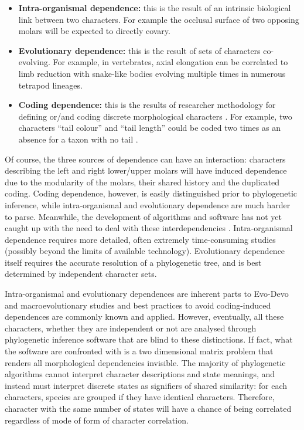 \documentclass[12pt,letterpaper]{article}
\begin{document}
\begin{itemize}
    \item \textbf{Intra-organismal dependence:} this is the result of an intrinsic biological link between two characters.
    For example the occlusal surface of two opposing molars will be expected to directly covary.
 
    \item \textbf{Evolutionary dependence:} this is the result of sets of characters co-evolving. 
    For example, in vertebrates, axial elongation can be correlated to limb reduction with snake-like bodies evolving multiple times in numerous tetrapod lineages.

    \item \textbf{Coding dependence:} this is the results of researcher methodology for defining or/and coding discrete morphological characters \citep{Brazeau2011,simoes2017giant}.
    For example, two characters ``tail colour'' and ``tail length'' could be coded two times as an absence for a taxon with no tail \citep{wilkinson1995coping,BrazeauNA}.
\end{itemize}

\noindent Of course, the three sources of dependence can have an interaction: characters describing the left and right lower/upper molars will have induced dependence due to the modularity of the molars, their shared history and the duplicated coding.
Coding dependence, however, is easily distinguished prior to phylogenetic inference, while intra-organismal and evolutionary dependence are much harder to parse.
Meanwhile, the development of algorithms and software has not yet caught up with the need to deal with these interdependencies \citep{de2015parsimony,BrazeauNA}.
Intra-organismal dependence requires more detailed, often extremely time-consuming studies (possibly beyond the limits of available technology).
Evolutionary dependence itself requires the accurate resolution of a phylogenetic tree, and is best determined by independent character sets. 

Intra-organismal and evolutionary dependences are inherent parts to Evo-Devo and macroevolutionary studies and best practices to avoid coding-induced dependences are commonly known and applied.
However, eventually, all these characters, whether they are independent or not are analysed through phylogenetic inference software that are blind to these distinctions.
If fact, what the software are confronted with is a two dimensional matrix problem that renders all morphological dependencies invisible.
The majority of phylogenetic algorithms cannot interpret character descriptions and state meanings, and instead must interpret discrete states as signifiers of shared similarity: for each characters, species are grouped if they have identical characters.
Therefore, character with the same number of states will have a chance of being correlated regardless of mode of form of character correlation.
\end{document}
